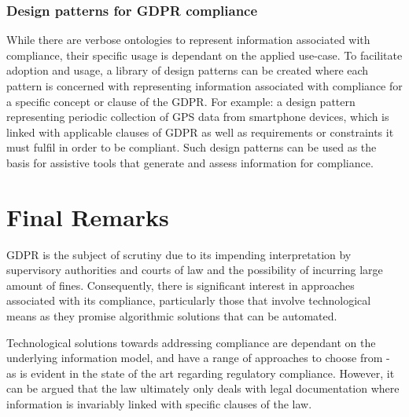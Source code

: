 \subsubsection*{Design patterns for GDPR compliance}
While there are verbose ontologies to represent information associated with compliance, their specific usage is dependant on the applied use-case. To facilitate adoption and usage, a library of design patterns can be created where each pattern is concerned with representing information associated with compliance for a specific concept or clause of the GDPR. For example: a design pattern representing periodic collection of GPS data from smartphone devices, which is linked with applicable clauses of GDPR as well as requirements or constraints it must fulfil in order to be compliant. Such design patterns can be used as the basis for assistive tools that generate and assess information for compliance.


\section{Final Remarks}\label{sec:conclusion-final-remarks}
GDPR is the subject of scrutiny due to its impending interpretation by supervisory authorities and courts of law and the possibility of incurring large amount of fines. Consequently, there is significant interest in approaches associated with its compliance, particularly those that involve technological means as they promise algorithmic solutions that can be automated.

Technological solutions towards addressing compliance are dependant on the underlying information model, and have a range of approaches to choose from - as is evident in the state of the art regarding regulatory compliance. However, it can be argued that the law ultimately only deals with legal documentation where information is invariably linked with specific clauses of the law.


